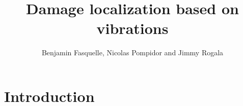 \documentclass{beamer}
\title{Damage localization based on vibrations}
\author{Benjamin Fasquelle, Nicolas Pompidor and Jimmy Rogala}
\institute{École Normale Supérieure de Rennes, département Informatique et Télécommunications}
\begin{document}




  \begin{frame}
  \titlepage
  \end{frame}



\section{Introduction}
\end{document}
